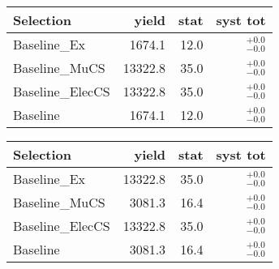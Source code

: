 
\begin{tabular}{l|rrr}
\toprule
          Selection & yield & stat & syst tot   \\ 
\midrule
       Baseline\_Ex & 1674.1 & 12.0 & ${}^{+0.0}_{-0.0}$ \\
     Baseline\_MuCS & 13322.8 & 35.0 & ${}^{+0.0}_{-0.0}$ \\
   Baseline\_ElecCS & 13322.8 & 35.0 & ${}^{+0.0}_{-0.0}$ \\
           Baseline & 1674.1 & 12.0 & ${}^{+0.0}_{-0.0}$ \\
\bottomrule
\end{tabular}



\begin{tabular}{l|rrr}
\toprule
          Selection & yield & stat & syst tot   \\ 
\midrule
       Baseline\_Ex & 13322.8 & 35.0 & ${}^{+0.0}_{-0.0}$ \\
     Baseline\_MuCS & 3081.3 & 16.4 & ${}^{+0.0}_{-0.0}$ \\
   Baseline\_ElecCS & 13322.8 & 35.0 & ${}^{+0.0}_{-0.0}$ \\
           Baseline & 3081.3 & 16.4 & ${}^{+0.0}_{-0.0}$ \\
\bottomrule
\end{tabular}
